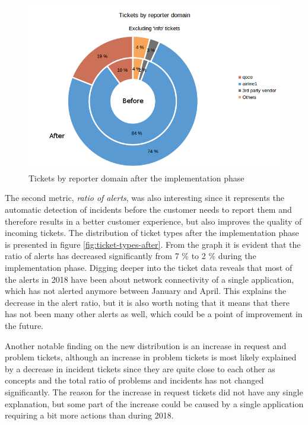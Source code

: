 \begin{figure}[ht]
  \begin{center}
    \includegraphics[width=\textwidth]{images/ticket-domains-after-2.png}
    \caption{Tickets by reporter domain after the implementation phase}
    \label{fig:ticket-domains-after}
  \end{center}
\end{figure}

The second metric, \emph{ratio of alerts}, was also interesting since it represents the automatic detection of incidents before the customer needs to report them and therefore results in a better customer
experience, but also improves the quality of incoming tickets. The distribution of ticket types after the implementation phase is presented in figure \ref{fig:ticket-types-after}. From the graph it is evident
that the ratio of alerts has decreased significantly from 7 \% to 2 \% during the implementation phase. Digging deeper into the ticket data reveals that most of the alerts in 2018 have been about network
connectivity of a single application, which has not alerted anymore between January and April. This explains the decrease in the alert ratio, but it is also worth noting that it means that there has not been many
other alerts as well, which could be a point of improvement in the future.

Another notable finding on the new distribution is an increase in request and problem tickets, although
an increase in problem tickets is most likely explained by a decrease in incident tickets since they are quite close to each other as concepts
and the total ratio of problems and incidents has not changed significantly. The reason for the increase in request tickets did not have any single explanation, but some part of the increase could be caused by
a single application requiring a bit more actions than during 2018.

